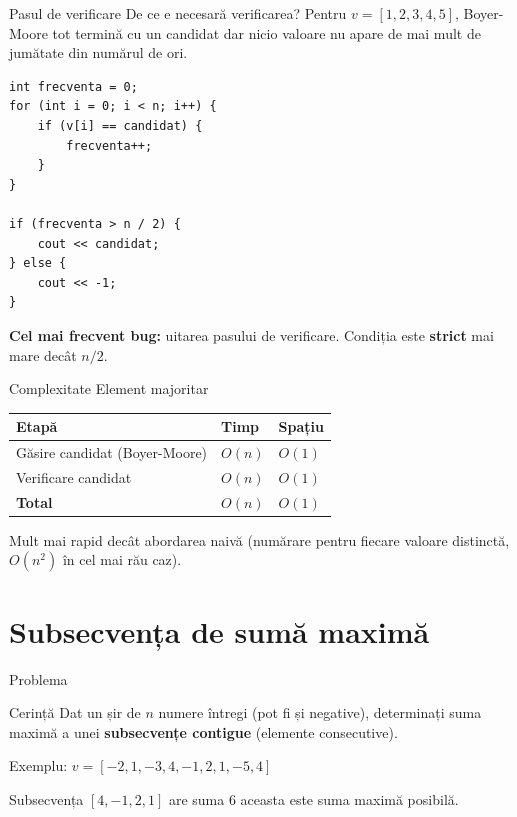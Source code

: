 ﻿\documentclass{beamer}
\begin{document}
\begin{frame}{Pasul de verificare}
  De ce e necesară verificarea? Pentru $v = [1, 2, 3, 4, 5]$, Boyer-Moore tot termină cu un candidat \textemdash{} dar nicio valoare nu apare de mai mult de jumătate din numărul de ori.
  \begin{lstlisting}
int frecventa = 0;
for (int i = 0; i < n; i++) {
    if (v[i] == candidat) {
        frecventa++;
    }
}

if (frecventa > n / 2) {
    cout << candidat;
} else {
    cout << -1;
}
  \end{lstlisting}
  \textbf{Cel mai frecvent bug:} uitarea pasului de verificare. Condiția este \textbf{strict} mai mare decât $n/2$.
\end{frame}

\begin{frame}{Complexitate \textemdash{} Element majoritar}
  \begin{center}
  \begin{tabular}{lll}
    \toprule
    Etapă & Timp & Spațiu \\
    \midrule
    Găsire candidat (Boyer-Moore) & $O(n)$ & $O(1)$ \\
    Verificare candidat           & $O(n)$ & $O(1)$ \\
    \midrule
    \textbf{Total}                & $O(n)$ & $O(1)$ \\
    \bottomrule
  \end{tabular}
  \end{center}

  \smallskip
  Mult mai rapid decât abordarea naivă (numărare pentru fiecare valoare distinctă, $O(n^2)$ în cel mai rău caz).
\end{frame}

\section{Subsecvența de sumă maximă}

\begin{frame}{Problema}
  \begin{block}{Cerință}
    Dat un șir de $n$ numere întregi (pot fi și negative), determinați suma maximă a unei \textbf{subsecvențe contigue} (elemente consecutive).
  \end{block}

  \smallskip
  Exemplu: $v = [-2, 1, -3, 4, -1, 2, 1, -5, 4]$

  \smallskip
  Subsecvența $[4, -1, 2, 1]$ are suma $6$ \textemdash{} aceasta este suma maximă posibilă.
\end{frame}
\end{document}
